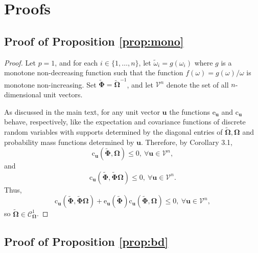 \documentclass[12pt]{article}
\newcommand{\bl}[1]{{\mathbf #1}}
\newcommand{\bs}[1]{\boldsymbol #1}
\begin{document}



\appendix

\section{Proofs}\label{asec:proofs}

\subsection{{Proof of Proposition \ref{prop:mono}}}

\begin{proof}
Let $p=1$, and for each $i \in \{1, \dots, n\}$, let $\tilde{\omega}_i = g(\omega_i)$ where $g$ is a monotone non-decreasing function such that the function $f(\omega) = g(\omega)/\omega$ is monotone non-increasing. Set $\tilde{\bs{\Phi}} = \tilde{\bs{\Omega}}^{-1}$, and let $\mathcal{V}^n$ denote the set of all $n$-dimensional unit vectors. 

As discussed in the main text, for any unit vector $\bl{u}$ the functions $\mathrm{e}_{\bl{u}}$ and $ \mathrm{c}_{\bl{u}}$ behave, respectively, like the expectation and covariance functions of discrete random variables with supports determined by the diagonal entries of $\tilde{\bs{\Omega}}, \bs{\Omega}$ and probability mass functions determined by $\bl{u}$. Therefore, by \cite{schmidt_inequalities_2014} Corollary 3.1,
\begin{equation*}
    \mathrm{c}_{\bl{u}}(\tilde{\bs{\Phi}}, \bs{\Omega}) \leq 0,~\forall \bl{u} \in \mathcal{V}^n,
\end{equation*}
and
\begin{equation*}
    \mathrm{c}_{\bl{u}}(\tilde{\bs{\Phi}}, \tilde{\bs{\Phi}} \bs{\Omega}) \leq 0,~\forall \bl{u} \in \mathcal{V}^n.
\end{equation*}
Thus, 
\begin{equation*}
    \mathrm{c}_{\bl{u}}(\tilde{\bs{\Phi}}, \tilde{\bs{\Phi}} \bs{\Omega}) + \mathrm{e}_{\bl{u}}(\tilde{\bs{\Phi}})\mathrm{c}_{\bl{u}}(\tilde{\bs{\Phi}}, \bs{\Omega})\leq 0,~\forall \bl{u} \in \mathcal{V}^n,
\end{equation*}
so $\tilde{\bs{\Omega}} \in \mathcal{C}^1_{\bs{\Omega}}$.
\end{proof}

\subsection{{Proof of Proposition \ref{prop:bd}}}
\end{document}

